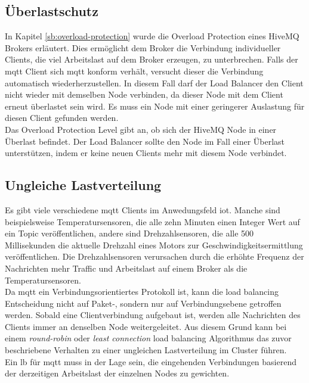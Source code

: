 \subsection{Überlastschutz}
In Kapitel \ref{sb:overload-protection} wurde die Overload Protection eines HiveMQ Brokers erläutert. Dies ermöglicht dem Broker die Verbindung individueller Clients, die viel Arbeitslast auf dem Broker erzeugen, zu unterbrechen. Falls der \ac{mqtt} Client sich \ac{mqtt} konform verhält, versucht dieser die Verbindung automatisch wiederherzustellen.
In diesem Fall darf der Load Balancer den Client nicht wieder mit demselben Node verbinden, da dieser Node mit dem Client erneut überlastet sein wird. Es muss ein Node mit einer geringerer Auslastung für diesen Client gefunden werden.
\\
Das Overload Protection Level gibt an, ob sich der HiveMQ Node in einer Überlast befindet. Der Load Balancer sollte den Node im Fall einer Überlast unterstützen, indem er keine neuen Clients mehr mit diesem Node verbindet.

\subsection{Ungleiche Lastverteilung} \label{sp:load}
Es gibt viele verschiedene \ac{mqtt} Clients im Anwedungsfeld \ac{iot}. Manche sind beispielsweise Temperatursensoren, die alle zehn Minuten einen Integer Wert auf ein Topic veröffentlichen, andere sind Drehzahlsensoren, die alle 500 Millisekunden die aktuelle Drehzahl eines Motors zur Geschwindigkeitsermittlung veröffentlichen.
Die Drehzahlsensoren verursachen durch die erhöhte Frequenz der Nachrichten mehr Traffic und Arbeitslast auf einem Broker als die Temperatursensoren.
\\
Da \ac{mqtt} ein Verbindungsorientiertes Protokoll ist, kann die load balancing Entscheidung nicht auf Paket-, sondern nur auf Verbindungsebene getroffen werden. Sobald eine Clientverbindung aufgebaut ist, werden alle Nachrichten des Clients immer an denselben Node weitergeleitet.
Aus diesem Grund kann bei einem \textit{round-robin} oder \textit{least connection} load balancing Algorithmus das zuvor beschriebene Verhalten zu einer ungleichen Lastverteilung im Cluster führen.
\\
Ein \ac{lb} für \ac{mqtt} muss in der Lage sein, die eingehenden Verbindungen basierend der derzeitigen Arbeitslast der einzelnen Nodes zu gewichten.

\begin{comment}
\ac{mqtt} Clients haben keine Grenze an Topics die sie abonnieren können. Mit einer Wildcard Subscription ist es sogar möglich, alle Topics die auf einem Broker existieren mit einer Subscription zu abonnieren: \verb|#|. Ein Client, der eine solche Subscription hat, verursacht mehr Traffic und Arbeitslast auf einem Broker als ein Client, der alle zehn Minuten einen Integer Wert auf dem Topic \verb|sensors/temperature| veröffentlicht.
Wie in Kapitel \ref{s:domain} erläutert sind im Anwendungsfeld \ac{iot} die beschriebenen Clients keine seltenheit.
\end{comment}

